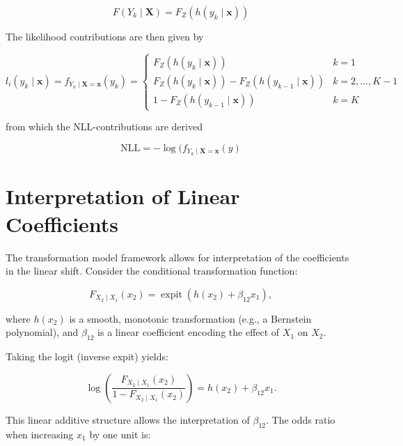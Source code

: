 \begin{equation}
F(Y_k \mid \mathbf{X}) = F_Z(h(y_k \mid \mathbf{x}))
\end{equation}

The likelihood contributions are then given by

\begin{equation}
l_i(y_k \mid \mathbf{x}) = f_{Y_k \mid \mathbf{X} = \mathbf{x}}(y_k) =
    \begin{cases}
      F_Z(h(y_k \mid \mathbf{x})) & k=1\\
      F_Z(h(y_k \mid \mathbf{x})) - F_Z(h(y_{k-1} \mid \mathbf{x})) & k=2,\ldots, K-1\\
      1- F_Z(h(y_{k-1} \mid \mathbf{x})) & k = K
    \end{cases}
\end{equation}


from which the NLL-contributions are derived

\begin{equation}
\text{NLL} = - \log (f_{Y_k \mid \mathbf{X} = \mathbf{x}}(y)
\end{equation}


\section{Interpretation of Linear Coefficients} \label{sec:interpretation_linear_coefficients}

The transformation model framework allows for interpretation of the coefficients in the linear shift. Consider the conditional transformation function:

\begin{equation}
F_{X_2 \mid X_1}(x_2) = \operatorname{expit}( h(x_2) + \beta_{12} x_1 ),
\end{equation}

where \( h(x_2) \) is a smooth, monotonic transformation (e.g., a Bernstein polynomial), and \( \beta_{12} \) is a linear coefficient encoding the effect of \( X_1 \) on \( X_2 \).

Taking the logit (inverse expit) yields:

\begin{equation}
\log\left( \frac{F_{X_2 \mid X_1}(x_2)}{1 - F_{X_2 \mid X_1}(x_2)} \right)
= h(x_2) + \beta_{12} x_1.
\end{equation}

This linear additive structure allows the interpretation of \( \beta_{12} \). The odds ratio when increasing \( x_1 \) by one unit is:

